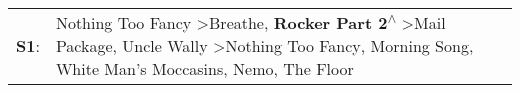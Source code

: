 \begin{supertabular}{p{0.03\textwidth}p{0.92\textwidth}}
 \textbf{S1}:  &  Nothing Too Fancy\textsuperscript{} \textgreater \enspace Breathe\textsuperscript{}, \enspace \textbf{Rocker Part 2\textsuperscript{$\wedge$}} \textgreater \enspace Mail Package\textsuperscript{}, \enspace Uncle Wally\textsuperscript{} \textgreater \enspace Nothing Too Fancy\textsuperscript{}, \enspace Morning Song\textsuperscript{}, \enspace White Man's Moccasins\textsuperscript{}, \enspace Nemo\textsuperscript{}, \enspace The Floor\textsuperscript{}  \enspace  \\
\end{supertabular}
